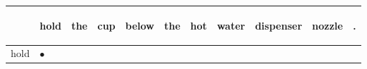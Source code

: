 \documentclass[landscape]{article}
\newcommand{\ssp}{\hspace{2pt}}
\newcommand{\mex}{\cellcolor{g}$\bullet$}
\begin{document}
\noindent\begin{tabular}{|l|p{10pt}|p{10pt}|p{10pt}|p{10pt}|p{10pt}|p{10pt}|p{10pt}|p{10pt}|p{10pt}|p{10pt}|}
\hline
&\begin{sideways}\cellcolor{ref0}hold\hspace{12pt}\end{sideways}&\begin{sideways}\cellcolor{ref1}the\hspace{12pt}\end{sideways}&\begin{sideways}\cellcolor{ref2}cup\hspace{12pt}\end{sideways}&\begin{sideways}\cellcolor{ref3}below\hspace{12pt}\end{sideways}&\begin{sideways}\cellcolor{ref4}the\hspace{12pt}\end{sideways}&\begin{sideways}\cellcolor{ref5}hot\hspace{12pt}\end{sideways}&\begin{sideways}\cellcolor{ref6}water\hspace{12pt}\end{sideways}&\begin{sideways}\cellcolor{ref7}dispenser\hspace{12pt}\end{sideways}&\begin{sideways}\cellcolor{ref8}nozzle\hspace{12pt}\end{sideways}&\begin{sideways}\cellcolor{ref9}.\hspace{12pt}\end{sideways}\\
\hline
\ssp \cellcolor{ref0}hold \ssp&\hspace{2pt}\mex&\hspace{2pt}&\hspace{2pt}&\hspace{2pt}&\hspace{2pt}&\hspace{2pt}&\hspace{2pt}&\hspace{2pt}&\hspace{2pt}&\hspace{2pt}\\

\end{tabular}
\end{document}
